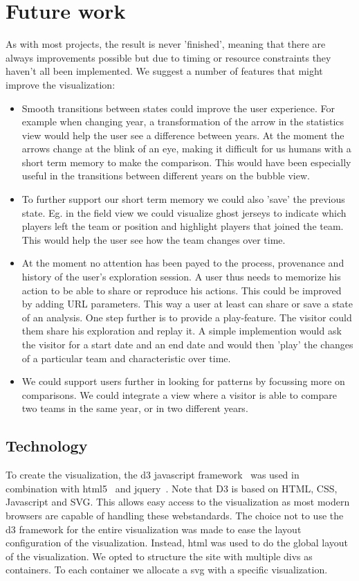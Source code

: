 \documentclass[chi_draft]{sigchi}
\begin{document}
\section{Future work}
As with most projects, the result is never 'finished', meaning that there are
always improvements possible but due to timing or resource constraints they
haven't all been implemented. We suggest a number of features that might improve
the visualization:
\begin{itemize}
    \item Smooth transitions between states could improve the user experience.
        For example when changing year, a transformation of the arrow in the
        statistics view would help the user see a difference between years.  At
        the moment the arrows change at the blink of an eye, making it difficult
        for us humans with a short term memory to make the comparison. This
        would have been especially useful in the transitions between different
        years on the bubble view.
    \item To further support our short term memory we could also 'save' the
        previous state. Eg. in the field view we could visualize ghost jerseys
        to indicate which players left the team or position and highlight
        players that joined the team.  This would help the user see how the team
        changes over time.
    \item At the moment no attention has been payed to the process, provenance
        and history of the user's exploration session. A user thus needs to
        memorize his action to be able to share or reproduce his actions. This
        could be improved by adding URL parameters. This way a user at least can
        share or save a state of an analysis. One step further is to provide a
        play-feature. The visitor could them share his exploration and replay
        it. A simple implemention would ask the visitor for a start date and an
        end date and would then 'play' the changes of a particular team and
        characteristic over time.
    \item We could support users further in looking for patterns by focussing
        more on comparisons. We could integrate a view where a visitor is able
        to compare two teams in the same year, or in two different years.
\end{itemize}

\subsection{Technology}
To create the visualization, the d3 javascript framework~\cite{d3.js} was used
in combination with html5~\cite{html5} and jquery~\cite{jquery}.  Note that D3
is based on HTML, CSS, Javascript and SVG. This allows easy access to the visualization as
most modern browsers are capable of handling these webstandards.  The choice not
to use the d3 framework for the entire visualization was made to ease the layout
configuration of the visualization. Instead, html was used to do the global
layout of the visualization. We opted to structure the site with multiple divs
as containers. To each container we allocate a svg with a specific
visualization.
\end{document}
